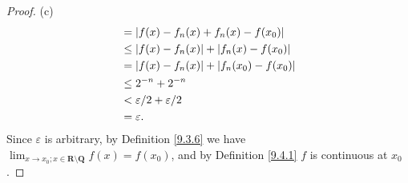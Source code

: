 \begin{proof}{(c)}
\begin{align*}
         & = \abs*{f(x) - f_n(x) + f_n(x) - f(x_0)}           \\
         & \leq \abs*{f(x) - f_n(x)} + \abs*{f_n(x) - f(x_0)} \\
         & = \abs*{f(x) - f_n(x)} + \abs*{f_n(x_0) - f(x_0)}  \\
         & \leq 2^{-n} + 2^{-n}                               \\
         & < \varepsilon / 2 + \varepsilon / 2                \\
         & = \varepsilon.
    \end{align*}
    Since \(\varepsilon\) is arbitrary, by Definition \ref{9.3.6} we have \(\lim_{x \to x_0 ; x \in \mathbf{R} \setminus \mathbf{Q}} f(x) = f(x_0)\), and by Definition \ref{9.4.1} \(f\) is continuous at \(x_0\).
\end{proof}